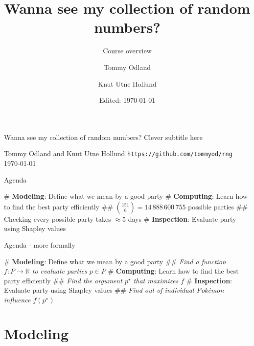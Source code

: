 \documentclass[12pt, aspectratio=149]{beamer}
\institute{Equinor}
\date{Edited: \today}
\author{Tommy Odland \and Knut Utne Hollund}
\title{Wanna see my collection of random numbers?}
\subtitle{Course overview}
\theoremstyle{plain}
\begin{document}
\begin{frame}{}
	\begin{center}
			\vfill
	{\huge Wanna see my collection of random numbers?}
	\vfill
	{\large Clever subtitle here}
	\vfill
	

	\vfill
	{\large  Tommy Odland and Knut Utne Hollund}
	\vfill
	{\small \texttt{https://github.com/tommyod/rng}}
	\vfill
	\today
	\vfill
	\end{center}
\end{frame}


\begin{frame}[fragile]{Agenda}
	\begin{center}
	\end{center}
	
	\begin{easylist}[itemize]
		# \textbf{Modeling}: Define what we mean by a good party
		# \textbf{Computing}: Learn how to find the best party efficiently
		## $\binom{151}{6} = 14\,888\,600\,755$ possible parties
		## Checking every possible party takes $\approx 5$ days
		# \textbf{Inspection}: Evaluate party using Shapley values
	\end{easylist}
\end{frame}

\begin{frame}[fragile]{Agenda - more formally}
		\begin{center}
	\end{center}

	\begin{easylist}[itemize]
		# \textbf{Modeling}: Define what we mean by a good party
		## \emph{Find a function $f:P \to \mathbb{R}$ to evaluate parties $p \in P$}
		# \textbf{Computing}: Learn how to find the best party efficiently
		## \emph{Find the argument $p^\star$ that maximizes $f$}
		# \textbf{Inspection}: Evaluate party using Shapley values
		## \emph{Find out of individual Pokémon influence $f(p^\star)$}
	\end{easylist}
\end{frame}

\section{Modeling}
\end{document}
